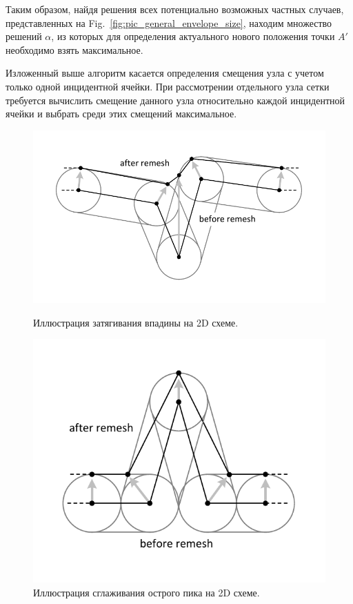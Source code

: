 \documentclass[
11pt,%
tightenlines,%
twoside,%
onecolumn,%
nofloats,%
nobibnotes,%
nofootinbib,%
superscriptaddress,%
noshowpacs,%
centertags]%
{revtex4}
\begin{document}
Таким образом, найдя решения всех потенциально возможных частных случаев, представленных на Fig.~\ref{fig:pic_general_envelope_size}, находим множество решений $\alpha$, из которых для определения актуального нового положения точки $A'$ необходимо взять максимальное.

Изложенный выше алгоритм касается определения смещения узла с учетом только одной инцидентной ячейки.
При рассмотрении отдельного узла сетки требуется вычислить смещение данного узла относительно каждой инцидентной ячейки и выбрать среди этих смещений максимальное.

\begin{figure}[h]
  \centering
  \begin{minipage}[h]{0.55\textwidth}
    \includegraphics[width=\textwidth]{pics/pic_general_envelope_3_size.pdf}
    \caption{Иллюстрация затягивания впадины на 2D схеме.}\label{fig:pic_general_envelope_3_size}
  \end{minipage}
  \hfill
  \begin{minipage}[h]{0.44\textwidth}
    \includegraphics[width=\textwidth]{pics/pic_general_envelope_4_size.pdf}
    \caption{Иллюстрация сглаживания острого пика на 2D схеме.}\label{fig:pic_general_envelope_4_size}
  \end{minipage}
\end{figure}
\end{document}
